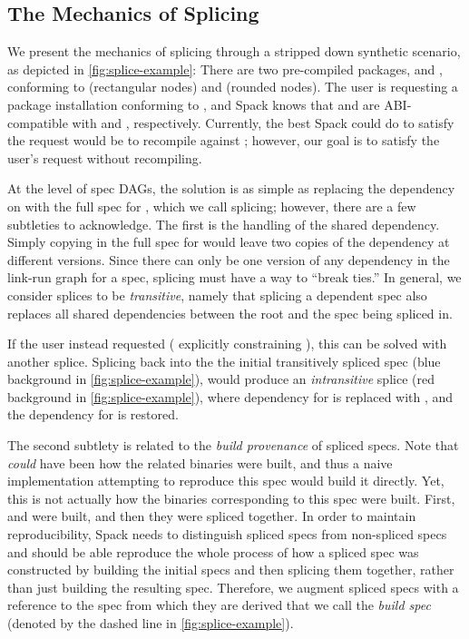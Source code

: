 \subsection{The Mechanics of Splicing}
\label{sec:splice-mechanics}
We present the mechanics of splicing through a stripped down synthetic scenario,
as depicted in \cref{fig:splice-example}: There are two pre-compiled packages,
 and , conforming to  (rectangular nodes)
and  (rounded nodes). The user is requesting a package
installation conforming to , and Spack knows that  and
 are ABI-compatible with  and ,
respectively. Currently, the best Spack could do to satisfy the request would be
to recompile  against ; however, our goal is to satisfy the
user's request without recompiling.

At the level of spec DAGs, the solution is as simple as replacing the 
dependency on  with the full spec for , which we call splicing;
however, there are a few subtleties to acknowledge. The first is the
handling of the shared  dependency. Simply copying in the full spec for
 would leave two copies of the  dependency at different
versions.  Since there can only be one version of any dependency in the link-run
graph for a spec, splicing must have a way to ``break ties.'' In general, we
consider splices to be \emph{transitive}, namely that splicing a dependent spec
also replaces all shared dependencies between the root and the spec being
spliced in.

If the user instead requested  (\ie{}
explicitly constraining ), this can be solved with another
splice. Splicing  back into the the initial transitively spliced spec
(blue background in \cref{fig:splice-example}), would produce an
\emph{intransitive} splice (red background in \cref{fig:splice-example}), where
 dependency for  is replaced with , and the
dependency for  is restored.

The second subtlety is related to the \emph{build provenance} of spliced
specs. Note that  \emph{could} have been how the related
binaries were built, and thus a naive implementation attempting to reproduce
this spec would build it directly. Yet, this is not actually how the binaries
corresponding to this spec were built. First,  and
 were built, and then they were spliced together. In order to
maintain reproducibility, Spack needs to distinguish spliced specs
from non-spliced specs and should be able reproduce the whole process of how a
spliced spec was constructed by building the initial specs and then splicing
them together, rather than just building the resulting spec. Therefore, we
augment spliced specs with a reference to the spec from which they are derived
that we call the \emph{build spec} (denoted by the dashed line in \cref{fig:splice-example}).

